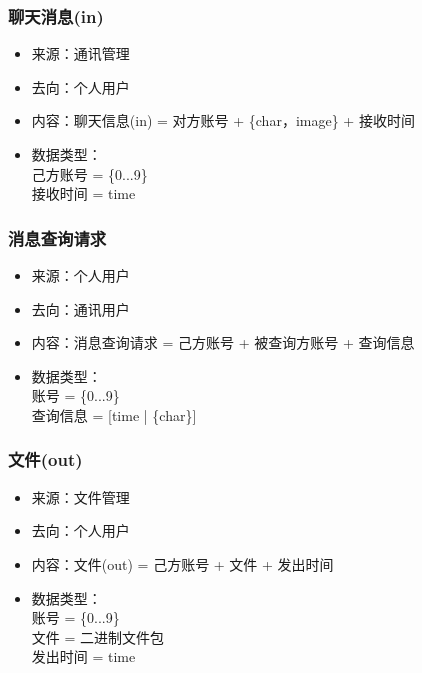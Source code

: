             \subsubsection{聊天消息(in)}
            \begin{itemize}
                \item 来源：通讯管理
                \item 去向：个人用户
                \item 内容：聊天信息(in) = 对方账号 + \{char，image\} + 接收时间
                \item 数据类型：\\
                己方账号 = \{0...9\}\\
                接收时间 = time\\
            \end{itemize}
            \subsubsection{消息查询请求}
            \begin{itemize}
                \item 来源：个人用户
                \item 去向：通讯用户
                \item 内容：消息查询请求 = 己方账号 + 被查询方账号 + 查询信息
                \item 数据类型：\\
                      账号 = \{0...9\}\\
                      查询信息 = [time | \{char\}]\\
            \end{itemize}
            \subsubsection{文件(out)}
            \begin{itemize}
                \item 来源：文件管理
                \item 去向：个人用户
                \item 内容：文件(out) = 己方账号 + 文件 + 发出时间
                \item 数据类型：\\
                账号 = \{0...9\}\\
                文件 = 二进制文件包\\
                发出时间 = time\\
            \end{itemize}
